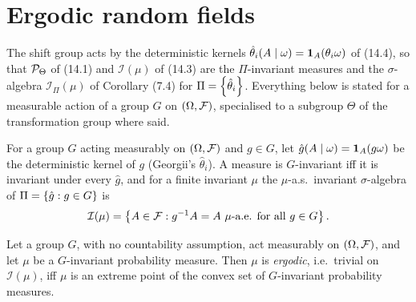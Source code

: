 \section{Ergodic random fields}

The shift group acts by the deterministic kernels $\hat\theta_i(A \mid \omega) = \mathbf{1}_A(\theta_i\omega)$
of (14.4), so that $\mathcal{P}_\Theta$ of (14.1) and $\mathcal{I}(\mu)$ of (14.3) are the
$\Pi$-invariant measures and the $\sigma$-algebra $\mathcal{I}_\Pi(\mu)$ of Corollary (7.4) for
$\Pi = \left\{ \hat\theta_i \right\}$. Everything below is stated for a measurable action of a group $G$ on
$(\Omega, \mathcal{F})$, specialised to a subgroup $\Theta$ of the transformation group where said.

\begin{definition}
    \label{def:erg-invariant}
    \leanok

    For a group $G$ acting measurably on $(\Omega, \mathcal{F})$ and $g \in G$, let
    $\hat g(A \mid \omega) = \mathbf{1}_A(g\omega)$ be the deterministic kernel of $g$ (Georgii's
    $\hat\theta_i$). A measure is $G$-invariant iff it is invariant under every $\hat g$, and for
    a finite invariant $\mu$ the $\mu$-a.s.\ invariant $\sigma$-algebra of
    $\Pi = \left\{ \hat g : g \in G \right\}$ is
    \[\mathcal{I}(\mu) = \left\{ A \in \mathcal{F} : g^{-1}A = A \ \mu\text{-a.e. for all } g \in G \right\}.\]
\end{definition}

\begin{theorem}
    \label{thm:erg-145a}
    \leanok

    Let a group $G$, with no countability assumption, act measurably on $(\Omega, \mathcal{F})$,
    and let $\mu$ be a $G$-invariant probability measure. Then $\mu$ is \emph{ergodic}, i.e.\
    trivial on $\mathcal{I}(\mu)$, iff $\mu$ is an extreme point of the convex set of
    $G$-invariant probability measures.
\end{theorem}

